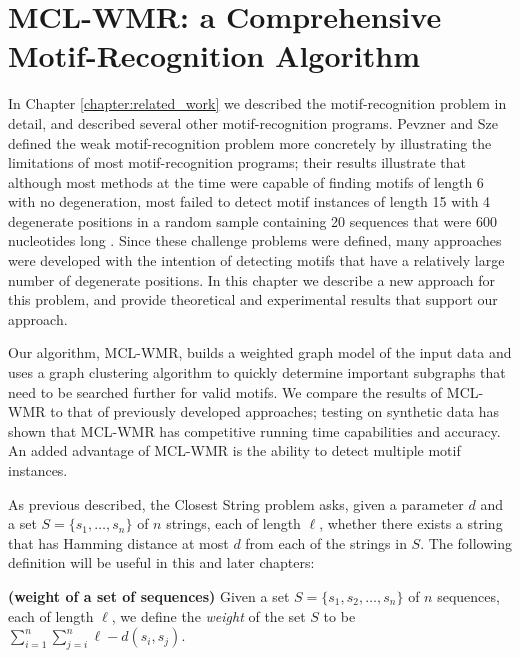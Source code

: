 \chapter{MCL-WMR: a Comprehensive Motif-Recognition Algorithm}\label{chapter:mclwmr}

In Chapter \ref{chapter:related_work} we described the motif-recognition problem in detail, and described several other motif-recognition programs.  Pevzner and Sze defined the weak motif-recognition problem more concretely by illustrating the limitations of most motif-recognition programs; their results illustrate that although most methods at the time were capable of finding motifs of length 6 with no degeneration, most failed to detect motif instances of length 15 with 4 degenerate positions in a random sample containing 20 sequences that were 600 nucleotides long \cite{PS00}.  Since these challenge problems were defined, many approaches were developed with the intention of detecting motifs that have a relatively large number of degenerate positions.  In this chapter we describe a new approach for this problem, and provide theoretical and experimental results that support our approach.

Our algorithm, MCL-WMR, builds a weighted graph model of the input data and uses a graph clustering algorithm to quickly determine important subgraphs that need to be searched further for valid motifs. We compare the results of MCL-WMR to that of previously developed approaches; testing on synthetic data has shown that MCL-WMR has competitive running time capabilities and accuracy.  An added advantage of MCL-WMR is the ability to detect multiple motif instances. 

As previous described, the {\sc Closest String} problem asks, given a parameter $d$ and a set $S = \{s_1, \ldots, s_n\}$ of $n$ strings, each of length $\ell$, whether there exists a string that has Hamming distance at most $d$ from each of the strings in $S$. The following definition will be useful in this and later chapters:

\begin{definition} {\bf (weight of a set of sequences)}\label{def:weight} Given a set $S = \{s_1, s_2, \ldots, s_n\}$ of $n$ sequences, each of length $\ell$, we define the {\em weight} of the set $S$ to be $\sum_{i = 1}^n \sum_{j = i}^n  \ell - d(s_i, s_j)$.  \end{definition}

